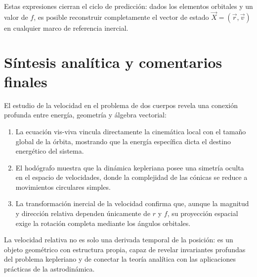 Estas expresiones cierran el ciclo de predicción: dados los elementos orbitales y un valor de \(f\), es posible reconstruir completamente el vector de estado \(\vec{X}=(\vec{r},\vec{v})\) en cualquier marco de referencia inercial.

\section{Síntesis analítica y comentarios finales}
El estudio de la velocidad en el problema de dos cuerpos revela una conexión profunda entre energía, geometría y álgebra vectorial:
\begin{enumerate}
    \item La ecuación vis-viva vincula directamente la cinemática local con el tamaño global de la órbita, mostrando que la energía específica dicta el destino energético del sistema.
    \item El hodógrafo muestra que la dinámica kepleriana posee una simetría oculta en el espacio de velocidades, donde la complejidad de las cónicas se reduce a movimientos circulares simples.
    \item La transformación inercial de la velocidad confirma que, aunque la magnitud y dirección relativa dependen únicamente de \(r\) y \(f\), su proyección espacial exige la rotación completa mediante los ángulos orbitales.
\end{enumerate}

\begin{importante}
La velocidad relativa no es solo una derivada temporal de la posición: es un objeto geométrico con estructura propia, capaz de revelar invariantes profundas del problema kepleriano y de conectar la teoría analítica con las aplicaciones prácticas de la astrodinámica.
\end{importante}